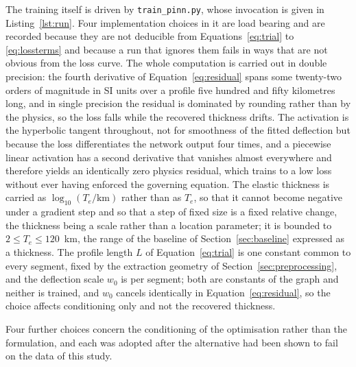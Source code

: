 \documentclass[final]{agujournal2019}
\begin{document}
The training itself is driven by \texttt{train\_pinn.py}, whose invocation is
given in Listing~\ref{lst:run}. Four implementation choices in it are load
bearing and are recorded because they are not deducible from
Equations~\eqref{eq:trial} to \eqref{eq:lossterms} and because a run that
ignores them fails in ways that are not obvious from the loss curve. The whole
computation is carried out in double precision: the fourth derivative of
Equation~\eqref{eq:residual} spans some twenty-two orders of magnitude in SI
units over a profile five hundred and fifty kilometres long, and in single
precision the residual is dominated by rounding rather than by the physics, so
the loss falls while the recovered thickness drifts. The activation is the
hyperbolic tangent throughout, not for smoothness of the fitted deflection but
because the loss differentiates the network output four times, and a piecewise
linear activation has a second derivative that vanishes almost everywhere and
therefore yields an identically zero physics residual, which trains to a low
loss without ever having enforced the governing equation. The elastic thickness
is carried as $\log_{10}(T_{e}/\mathrm{km})$ rather than as $T_{e}$, so that it
cannot become negative under a gradient step and so that a step of fixed size is
a fixed relative change, the thickness being a scale rather than a location
parameter; it is bounded to $2 \leq T_{e} \leq 120$~km, the range of the
baseline of Section~\ref{sec:baseline} expressed as a thickness. The profile
length $L$ of Equation~\eqref{eq:trial} is one constant common to every segment,
fixed by the extraction geometry of Section~\ref{sec:preprocessing}, and the
deflection scale $w_{0}$ is per segment; both are constants of the graph and
neither is trained, and $w_{0}$ cancels identically in
Equation~\eqref{eq:residual}, so the choice affects conditioning only and not
the recovered thickness.

Four further choices concern the conditioning of the optimisation rather than
the formulation, and each was adopted after the alternative had been shown to
fail on the data of this study.
\end{document}
